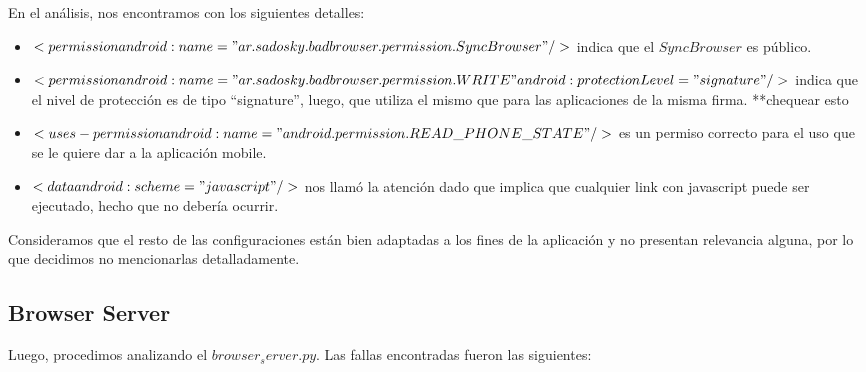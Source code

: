 \documentclass[10pt, a4paper]{article}
\begin{document}
En el análisis, nos encontramos con los siguientes detalles:
\begin{itemize}
\item $<permission android:name="ar.sadosky.badbrowser.permission.SyncBrowser"/>$ indica que el $SyncBrowser$ es público.
\item $<permission android:name="ar.sadosky.badbrowser.permission.WRITE" android:protectionLevel="signature"/>$ indica que el nivel de protección es de tipo ``signature'', luego, que utiliza el mismo que para las aplicaciones de la misma firma. **chequear esto
\item $<uses-permission android:name="android.permission.READ\_PHONE\_STATE"/>$ es un permiso correcto para el uso que se le quiere dar a la aplicación mobile.
\item $<data android:scheme="javascript"/>$ nos llamó la atención dado que implica que cualquier link con javascript puede ser ejecutado, hecho que no debería ocurrir.
\end{itemize}

Consideramos que el resto de las configuraciones están bien adaptadas a los fines de la aplicación y no presentan relevancia alguna, por lo que decidimos no mencionarlas detalladamente.

\subsection{Browser Server}
Luego, procedimos analizando el $browser_server.py$. Las fallas encontradas fueron las siguientes:
\end{document}
